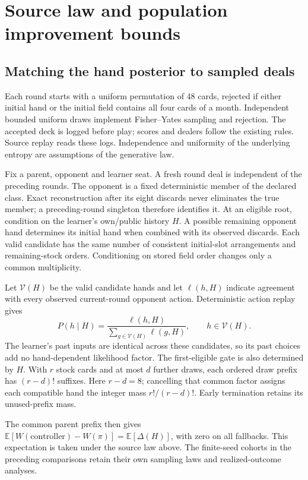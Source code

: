 \section{Source law and population improvement bounds}
\label{app:uniform-law}
\subsection{Matching the hand posterior to sampled deals}
Each round starts with a uniform permutation of 48 cards, rejected if either
initial hand or the initial field contains all four cards of a month. Independent
bounded uniform draws implement Fisher--Yates sampling and rejection. The
accepted deck is logged before play; scores and dealers follow the existing
rules. Source replay reads these logs. Independence and uniformity of the
underlying entropy are assumptions of the generative law.

Fix a parent, opponent and learner seat. A fresh round deal is independent of
the preceding rounds. The opponent is a fixed deterministic member of the
declared class. Exact reconstruction after its eight discards never eliminates
the true member; a preceding-round singleton therefore identifies it. At an
eligible root, condition on the learner's own/public history $H$. A possible
remaining opponent hand determines its initial hand when combined with its
observed discards. Each valid candidate has the same number of consistent
initial-slot arrangements and remaining-stock orders. Conditioning on stored
field order changes only a common multiplicity.

Let $\mathcal{V}(H)$ be the valid candidate hands and let $\ell(h,H)$ indicate
agreement with every observed current-round opponent action. Deterministic
action replay gives
\[
 P(h\mid H)=\frac{\ell(h,H)}{\sum_{g\in\mathcal{V}(H)}\ell(g,H)},
 \qquad h\in\mathcal{V}(H).
\]
The learner's past inputs are identical across these candidates, so its past
choices add no hand-dependent likelihood factor. The first-eligible gate is
also determined by $H$. With $r$ stock cards and at most $d$ further draws,
each ordered draw prefix has $(r-d)!$ suffixes. Here $r-d=8$; cancelling that
common factor assigns each compatible hand the integer mass
$r!/(r-d)!$. Early termination retains its unused-prefix mass.

The common parent prefix then gives
$\mathbb{E}[W(\mathrm{controller})-W(\pi)]=\mathbb{E}[\Delta(H)]$,
with zero on all fallbacks. This expectation is taken under the source law
above. The finite-seed cohorts in the preceding comparisons retain their own
sampling laws and realized-outcome analyses.

